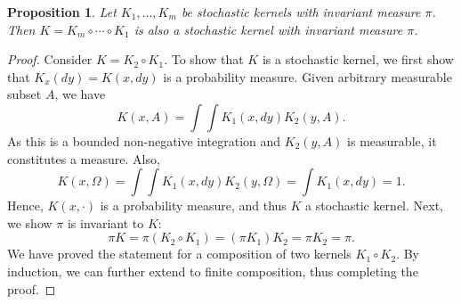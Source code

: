 \documentclass[a4paper,11pt]{article}
\newtheorem{proposition}{Proposition}
\begin{document}
\begin{proposition}
    Let $K_1, \ldots, K_m$ be stochastic kernels with invariant measure $\pi$. Then $K = K_m \circ \cdots \circ K_1$ is also a stochastic kernel with invariant measure $\pi$. 
\end{proposition}

\begin{proof}
    Consider $K = K_2 \circ K_1$. To show that $K$ is a stochastic kernel, we first show that $K_x(dy) = K(x, dy)$ is a probability measure. Given arbitrary measurable subset $A$, we have
    \begin{equation}
        K(x, A) = \int \int K_1(x, dy) K_2(y, A). 
    \end{equation}
    As this is a bounded non-negative integration and $K_2(y, A)$ is measurable, it constitutes a measure. Also, 
    \begin{equation}
        K(x, \Omega) = \int \int K_1(x, dy) K_2(y, \Omega) = \int K_1(x, dy) = 1.  
    \end{equation}
    Hence, $K(x, \cdot)$ is a probability measure, and thus $K$ a stochastic kernel.
    Next, we show $\pi$ is invariant to $K$:
    \begin{equation}
        \pi K = \pi (K_2 \circ K_1) = (\pi K_1) K_2  = \pi K_2 = \pi.
    \end{equation}
    We have proved the statement for a composition of two kernels $K_1 \circ K_2$. By induction, we can further extend to finite composition, thus completing the proof.
\end{proof}
\end{document}
